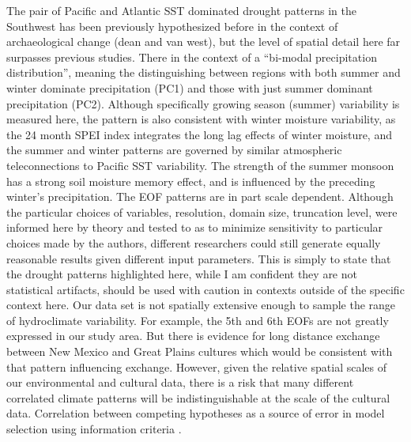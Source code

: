 \documentclass[10pt]{iopart}
\begin{document}
The pair of Pacific and Atlantic SST dominated drought patterns in the Southwest has been previously hypothesized before in the context of archaeological change (dean and van west), but the level of spatial detail here far surpasses previous studies. There in the context of a ``bi-modal precipitation distribution'', meaning the distinguishing between regions with both summer and winter dominate precipitation (PC1) and those with just summer dominant precipitation (PC2). Although specifically growing season (summer) variability is measured here, the pattern is also consistent with winter moisture variability, as the 24 month SPEI index integrates the long lag effects of winter moisture, and the summer and winter patterns are governed by similar atmospheric teleconnections to Pacific SST variability. The strength of the summer monsoon has a strong soil moisture memory effect, and is influenced by the preceding winter's precipitation. The EOF patterns are in part scale dependent. Although the particular choices of variables, resolution, domain size, truncation level, were informed here by theory and tested to as to minimize sensitivity to particular choices made by the authors, different researchers could still generate equally reasonable results given  different input parameters. This is simply to state that the drought patterns highlighted here, while I am confident they are not statistical artifacts, should be used with caution in contexts outside of the specific context here. Our data set is not spatially extensive enough to sample the range of hydroclimate variability. For example, the 5th and 6th EOFs are not greatly expressed in our study area. But there is evidence for long distance exchange between New Mexico and Great Plains cultures \parencite{Spielmann1983} which would be consistent with that pattern influencing exchange. However, given the relative spatial scales of our environmental and cultural data, there is a risk that many different correlated climate patterns will be indistinguishable at the scale of the cultural data. Correlation between competing hypotheses as a source of error in model selection using information criteria \parencite{Shirk2018}.

\end{document}

